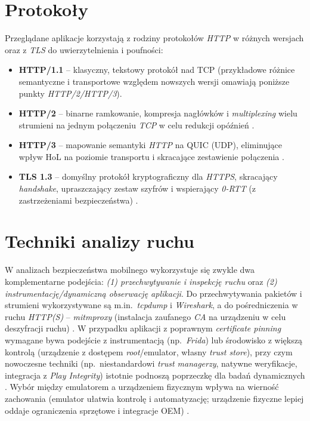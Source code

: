\section{Protokoły}
Przeglądane aplikacje korzystają z rodziny protokołów \emph{HTTP} w różnych wersjach oraz z \emph{TLS} do uwierzytelnienia i poufności:
\begin{itemize}
  \item \textbf{HTTP/1.1} – klasyczny, tekstowy protokół nad TCP (przykładowe różnice semantyczne i transportowe względem nowszych wersji omawiają poniższe punkty \emph{HTTP/2/HTTP/3}). 
  \item \textbf{HTTP/2} – binarne ramkowanie, kompresja nagłówków i \emph{multiplexing} wielu strumieni na jednym połączeniu \emph{TCP} w celu redukcji opóźnień \cite{RFC9113}.
  \item \textbf{HTTP/3} – mapowanie semantyki \emph{HTTP} na QUIC (UDP), eliminujące wpływ HoL na poziomie transportu i skracające zestawienie połączenia \cite{RFC9114,RFC9000}. 
  \item \textbf{TLS 1.3} – domyślny protokół kryptograficzny dla \emph{HTTPS}, skracający \emph{handshake}, upraszczający zestaw szyfrów i wspierający \emph{0-RTT} (z zastrzeżeniami bezpieczeństwa) \cite{RFC8446}.
\end{itemize}

\section{Techniki analizy ruchu}
W analizach bezpieczeństwa mobilnego wykorzystuje się zwykle dwa komplementarne podejścia: 
\emph{(1) przechwytywanie i inspekcję ruchu} oraz \emph{(2) instrumentację/dynamiczną obserwację aplikacji}. 
Do przechwytywania pakietów i strumieni wykorzystywane są m.in.\ \textit{tcpdump} i \textit{Wireshark}, a do pośredniczenia w ruchu \emph{HTTP(S)} – \textit{mitmproxy} (instalacja zaufanego \emph{CA} na urządzeniu w celu deszyfracji ruchu) \cite{tcpdump,WiresharkDocs,MitmproxyDocs,OWASPMASTGIntercept}. 
W przypadku aplikacji z poprawnym \emph{certificate pinning} wymagane bywa podejście z instrumentacją (np.\ \textit{Frida}) lub środowisko z większą kontrolą (urządzenie z dostępem \textit{root}/emulator, własny \emph{trust store}), przy czym nowoczesne techniki (np.\ niestandardowi \emph{trust managerzy}, natywne weryfikacje, integracja z \emph{Play Integrity}) istotnie podnoszą poprzeczkę dla badań dynamicznych \cite{Frida,OWASPMASTGPinning}. 
Wybór między emulatorem a urządzeniem fizycznym wpływa na wierność zachowania (emulator ułatwia kontrolę i automatyzację; urządzenie fizyczne lepiej oddaje ograniczenia sprzętowe i integracje OEM) \cite{OWASPMASTGIntercept}.

